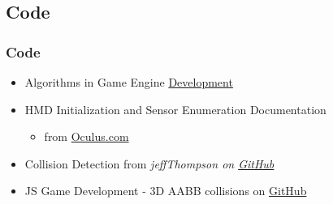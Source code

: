 \documentclass{beamer}
\begin{document}
\subsection{Code}
	\begin{frame}
	\frametitle{Code}
	\begin{itemize}
		\item Algorithms in Game Engine \href{http://www.haroldserrano.com/blog/algorithms-in-game-engine-development}{Development}
		\item HMD Initialization and Sensor Enumeration Documentation
			\begin{itemize}
				\item from \href{https://developer3.oculus.com/documentation/pcsdk/latest/concepts/dg-sensor/}{Oculus.com}
			\end{itemize}
		\item Collision Detection from \it{jeffThompson} on \href{https://github.com/jeffThompson/CollisionDetection}{GitHub}
		\item JS Game Development - 3D AABB collisions on \href{https://github.com/mozdevs/gamedev-js-3d-aabb}{GitHub}
	\end{itemize}
	\end{frame}
\end{document}

